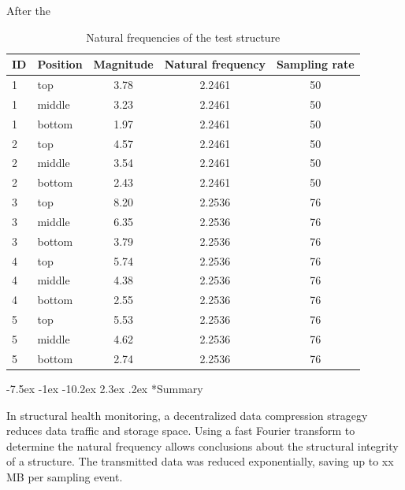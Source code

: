\documentclass[12pt,a4paper]{scrartcl}
\makeatletter
\renewcommand\section{\@startsection{section}{1}{\z@}%
                     {-7.5ex \@plus -1ex \@minus -10.2ex}%
                     {2.3ex \@plus.2ex}%
                     {\sffamily\large\bfseries}}
\makeatother
\begin{document}
After the 

\begin{table}[ht]
	\centering
	\begin{tabular}{l l c c c}
		\toprule
		ID & Position & Magnitude & Natural frequency & Sampling rate\\ 
		\midrule
		1 & top & 3.78 & 2.2461 & 50\\ 
		1 & middle & 3.23 & 2.2461 & 50\\ 
		1 & bottom & 1.97 & 2.2461 & 50\\ 
		\midrule
		2 & top & 4.57 & 2.2461 & 50\\ 
		2 & middle & 3.54 & 2.2461 & 50\\
		2 & bottom & 2.43 & 2.2461 & 50\\ 
		\midrule
		3 & top & 8.20 & 2.2536 & 76\\
		3 & middle & 6.35 & 2.2536 & 76\\ 
		3 & bottom & 3.79 & 2.2536 & 76\\
		\midrule	
		4 & top & 5.74 & 2.2536 & 76\\  
		4 & middle & 4.38 & 2.2536 & 76\\ 
		4 & bottom & 2.55 & 2.2536 & 76\\
		\midrule		
		5 & top & 5.53 & 2.2536 & 76\\  
		5 & middle & 4.62 & 2.2536 & 76\\ 
		5 & bottom & 2.74 & 2.2536 & 76\\ 		
		\bottomrule
	\end{tabular}
	\caption{Natural frequencies of the test structure}
	\label{tab:lab-ex}
\end{table}




\section*{Summary}

In structural health monitoring, a decentralized data compression stragegy reduces data traffic and storage space.
Using a fast Fourier transform to determine the natural frequency allows conclusions about the structural integrity of a structure.
The transmitted data was reduced exponentially, saving up to xx MB per sampling event.




\end{document}
